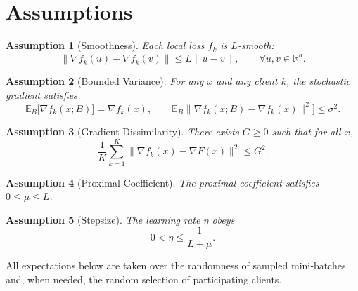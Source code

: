 \documentclass[11pt]{article}
\newtheorem{assumption}{Assumption}
\newcommand{\E}{\mathbb{E}}
\begin{document}
\section*{Assumptions}
\begin{assumption}[Smoothness]\label{ass:smooth}
Each local loss $f_k$ is $L$‑smooth:
\[
\|\nabla f_k(u)-\nabla f_k(v)\|\le L\|u-v\|,\qquad\forall u,v\in\mathbb{R}^d.
\]
\end{assumption}

\begin{assumption}[Bounded Variance]\label{ass:var}
For any $x$ and any client $k$, the stochastic gradient satisfies
\[
\E_{B}\bigl[\nabla f_k(x;B)\bigr]=\nabla f_k(x),\qquad 
\E_{B}\bigl\|\nabla f_k(x;B)-\nabla f_k(x)\|^2\bigr]\le\sigma^2 .
\]
\end{assumption}

\begin{assumption}[Gradient Dissimilarity]\label{ass:dissim}
There exists $G\ge0$ such that for all $x$,
\[
\frac{1}{K}\sum_{k=1}^{K}\|\nabla f_k(x)-\nabla F(x)\|^2\le G^2 .
\]
\end{assumption}

\begin{assumption}[Proximal Coefficient]\label{ass:mu}
The proximal coefficient satisfies $0\le\mu\le L$.
\end{assumption}

\begin{assumption}[Stepsize]\label{ass:stepsize}
The learning rate $\eta$ obeys
\[
0<\eta\le\frac{1}{L+\mu}.
\]
\end{assumption}

All expectations below are taken over the randomness of sampled mini‑batches and, when needed, the random selection of participating clients.

\end{document}
